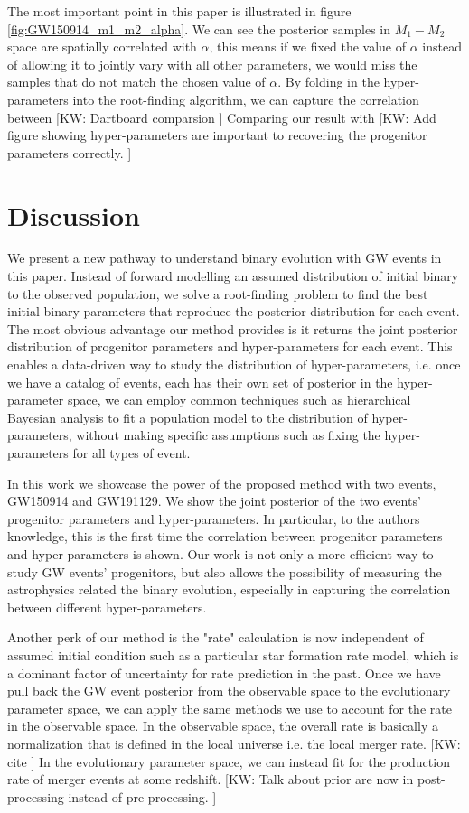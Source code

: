 \documentclass[twocolumn]{aastex631}
\newcommand{\kw}[1]{{\color{rb4}[KW: #1 ]}}
\begin{document}
The most important point in this paper is illustrated in figure \ref{fig:GW150914_m1_m2_alpha}.
We can see the posterior samples in $M_1-M_2$ space are spatially correlated with $\alpha$,
this means if we fixed the value of $\alpha$ instead of allowing it to jointly vary with all other parameters,
we would miss the samples that do not match the chosen value of $\alpha$.
By folding in the hyper-parameters into the root-finding algorithm,
we can capture the correlation between 
\kw{Dartboard comparsion} Comparing our result with 
\kw{Add figure showing hyper-parameters are important to recovering the progenitor parameters correctly.}

\section{Discussion}
\label{sec:discussion}


We present a new pathway to understand binary evolution with GW events in this paper.
Instead of forward modelling an assumed distribution of initial binary to the observed population,
we solve a root-finding problem to find the best initial binary parameters that reproduce the posterior distribution for each event. 
The most obvious advantage our method provides is it returns the joint posterior distribution of progenitor parameters and hyper-parameters for each event.
This enables a data-driven way to study the distribution of hyper-parameters,
i.e. once we have a catalog of events, each has their own set of posterior in the hyper-parameter space,
we can employ common techniques such as hierarchical Bayesian analysis to fit a population model to the distribution of hyper-parameters,
without making specific assumptions such as fixing the hyper-parameters for all types of event.
 
In this work we showcase the power of the proposed method with two events, GW150914 and GW191129.
We show the joint posterior of the two events' progenitor parameters and hyper-parameters.
In particular, to the authors knowledge, this is the first time the correlation between progenitor parameters and hyper-parameters is shown.
Our work is not only a more efficient way to study GW events' progenitors,
but also allows the possibility of measuring the astrophysics related the binary evolution, especially in capturing the correlation between different hyper-parameters.

Another perk of our method is the "rate" calculation is now independent of assumed initial condition such as a particular star formation rate model,
which is a dominant factor of uncertainty for rate prediction in the past.
Once we have pull back the GW event posterior from the observable space to the evolutionary parameter space,
we can apply the same methods we use to account for the rate in the observable space.
In the observable space, the overall rate is basically a normalization that is defined in the local universe i.e. the local merger rate. \kw{cite}
In the evolutionary parameter space, we can instead fit for the production rate of merger events at some redshift.
\kw{Talk about prior are now in post-processing instead of pre-processing.}
\end{document}
